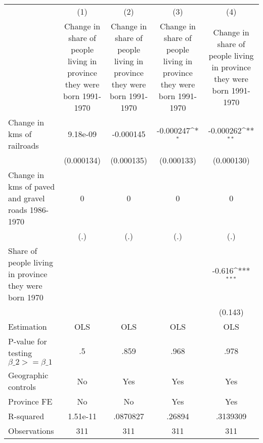 {
\def\sym#1{\ifmmode^{#1}\else\(^{#1}\)\fi}
\begin{tabular}{l*{4}{c}}
\hline\hline
                &\multicolumn{1}{c}{(1)}&\multicolumn{1}{c}{(2)}&\multicolumn{1}{c}{(3)}&\multicolumn{1}{c}{(4)}\\
                &\multicolumn{1}{c}{Change in share of people living in province they were born 1991-1970}&\multicolumn{1}{c}{Change in share of people living in province they were born 1991-1970}&\multicolumn{1}{c}{Change in share of people living in province they were born 1991-1970}&\multicolumn{1}{c}{Change in share of people living in province they were born 1991-1970}\\
\hline
Change in kms of railroads& 9.18e-09         &-0.000145         &-0.000247\sym{*}  &-0.000262\sym{**} \\
                &(0.000134)         &(0.000135)         &(0.000133)         &(0.000130)         \\
[1em]
Change in kms of paved and gravel roads 1986-1970&        0         &        0         &        0         &        0         \\
                &      (.)         &      (.)         &      (.)         &      (.)         \\
[1em]
Share of people living in province they were born 1970&                  &                  &                  &   -0.616\sym{***}\\
                &                  &                  &                  &  (0.143)         \\
\hline
Estimation      &      OLS         &      OLS         &      OLS         &      OLS         \\
P-value for testing $\beta\_2 >= \beta\_1$&       .5         &     .859         &     .968         &     .978         \\
Geographic controls&       No         &      Yes         &      Yes         &      Yes         \\
Province FE     &       No         &       No         &      Yes         &      Yes         \\
R-squared       & 1.51e-11         & .0870827         &   .26894         & .3139309         \\
Observations    &      311         &      311         &      311         &      311         \\
\hline\hline
\end{tabular}
}
